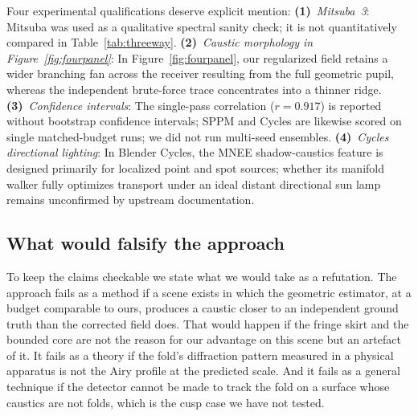 Four experimental qualifications deserve explicit mention:
\textbf{(1)}~\emph{Mitsuba~3}: Mitsuba was used as a qualitative spectral sanity check; it is not quantitatively compared in Table~\ref{tab:threeway}.
\textbf{(2)}~\emph{Caustic morphology in Figure~\ref{fig:fourpanel}}: In Figure~\ref{fig:fourpanel}, our regularized field retains a wider branching fan across the receiver resulting from the full geometric pupil, whereas the independent brute-force trace concentrates into a thinner ridge.
\textbf{(3)}~\emph{Confidence intervals}: The single-pass correlation ($r = 0.917$) is reported without bootstrap confidence intervals; SPPM and Cycles are likewise scored on single matched-budget runs; we did not run multi-seed ensembles.
\textbf{(4)}~\emph{Cycles directional lighting}: In Blender Cycles, the MNEE shadow-caustics feature is designed primarily for localized point and spot sources; whether its manifold walker fully optimizes transport under an ideal distant directional sun lamp remains unconfirmed by upstream documentation.

\subsection{What would falsify the approach}
\label{sec:limits-falsify}

To keep the claims checkable we state what we would take as a refutation. The
approach fails as a method if a scene exists in which the geometric estimator,
at a budget comparable to ours, produces a caustic closer to an independent
ground truth than the corrected field does. That would happen if the fringe skirt and
the bounded core are not the reason for our advantage on this scene but an
artefact of it. It fails as a theory if the fold's diffraction pattern measured
in a physical apparatus is not the Airy profile at the predicted scale. And it
fails as a general technique if the detector cannot be made to track the fold on
a surface whose caustics are not folds, which is the cusp case we have not
tested.
